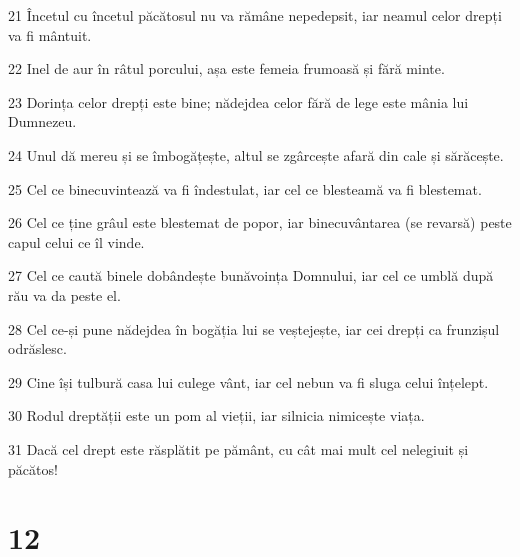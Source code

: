 \par 21 Încetul cu încetul păcătosul nu va rămâne nepedepsit, iar neamul celor drepți va fi mântuit.
\par 22 Inel de aur în râtul porcului, așa este femeia frumoasă și fără minte.
\par 23 Dorința celor drepți este bine; nădejdea celor fără de lege este mânia lui Dumnezeu.
\par 24 Unul dă mereu și se îmbogățește, altul se zgârcește afară din cale și sărăcește.
\par 25 Cel ce binecuvintează va fi îndestulat, iar cel ce blesteamă va fi blestemat.
\par 26 Cel ce ține grâul este blestemat de popor, iar binecuvântarea (se revarsă) peste capul celui ce îl vinde.
\par 27 Cel ce caută binele dobândește bunăvoința Domnului, iar cel ce umblă după rău va da peste el.
\par 28 Cel ce-și pune nădejdea în bogăția lui se veștejește, iar cei drepți ca frunzișul odrăslesc.
\par 29 Cine își tulbură casa lui culege vânt, iar cel nebun va fi sluga celui înțelept.
\par 30 Rodul dreptății este un pom al vieții, iar silnicia nimicește viața.
\par 31 Dacă cel drept este răsplătit pe pământ, cu cât mai mult cel nelegiuit și păcătos!

\chapter{12}

